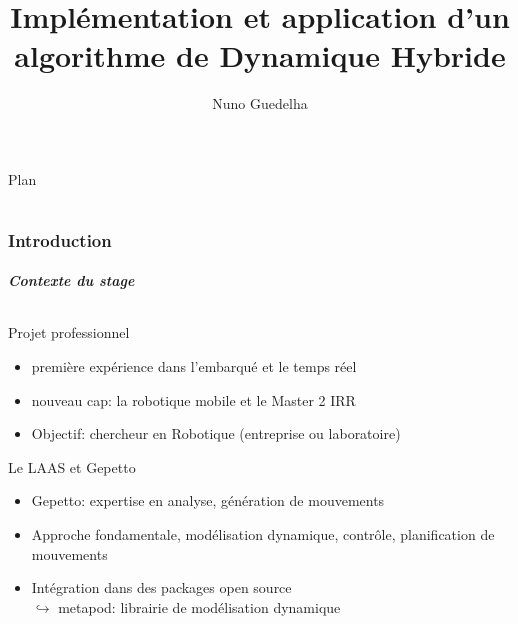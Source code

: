 \documentclass[10pt]{beamer}
\author{Nuno Guedelha}
\title{Implémentation et application d'un algorithme de Dynamique Hybride}
\institute{LAAS-CNRS}
\date{}
\begin{document}


\begin{frame}
\titlepage
\end{frame}

\begin{frame}{Plan}
\tableofcontents[part=01]
\tableofcontents[part=02]
\end{frame}

\part{}

\section{Introduction}

\begin{frame}
  \frametitle{Contexte du stage}
  \framesubtitle{}
  \begin{block}{Projet professionnel}
  \begin{itemize}
    \item première expérience dans l'embarqué et le temps réel
    \item nouveau cap: la robotique mobile et le Master 2 IRR
    \item Objectif: chercheur en Robotique (entreprise ou laboratoire)
  \end{itemize}
  \end{block}
  \begin{block}{Le LAAS et Gepetto}
  \begin{itemize}
    \item Gepetto: expertise en analyse, génération de mouvements  
    \item Approche fondamentale, modélisation dynamique, contrôle, planification de mouvements
    \item {Intégration dans des packages open source \\
          $\hookrightarrow$ metapod: librairie de modélisation dynamique}
    \note{}
  \end{itemize}
  \end{block}
\end{frame}
\end{document}
